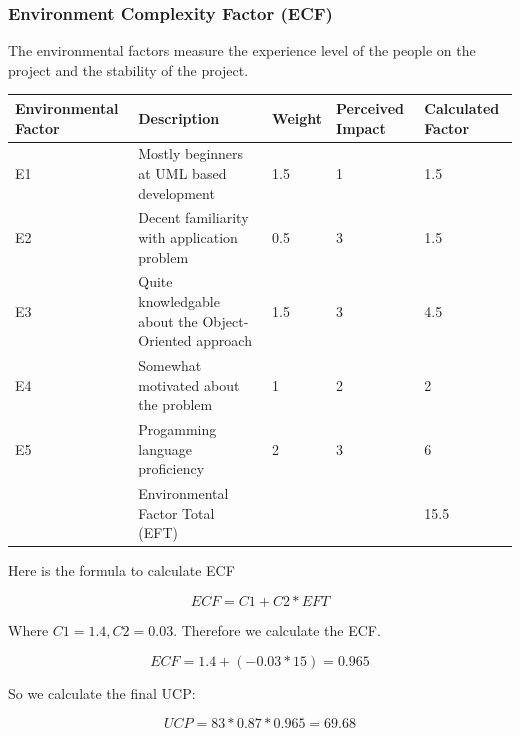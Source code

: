 \documentclass[letterpaper,english, 12pt]{scrreprt}
\begin{document}
\subsubsection{Environment Complexity Factor (ECF)}

The environmental factors measure the experience level of the people on the project and the stability of the project. 

\begin{center}
        \begin{tabular}{|C{3cm}|C{5cm}|C{1.5cm}|C{2cm}|C{2cm}|}
                \hline
                        Environmental Factor & Description & Weight & Perceived Impact & Calculated Factor \\
                \hline
                        E1 & Mostly beginners at UML based development & 1.5 & 1 & 1.5 \\
                \hline
                        E2 & Decent familiarity with application problem& 0.5 & 3 & 1.5\\
                \hline
                        E3 & Quite knowledgable about the Object-Oriented approach & 1.5 & 3 & 4.5 \\
                \hline
                        E4 & Somewhat motivated about the problem & 1 & 2 & 2 \\
                \hline
                        E5 & Progamming language proficiency & 2 & 3 & 6 \\
                \hline
                           & Environmental Factor Total (EFT) & & & 15.5 \\
                \hline
        \end{tabular}
\end{center}

Here is the formula to calculate ECF

\begin{equation}
ECF = C1 + C2 * EFT
\end{equation}

Where $C1 = 1.4, C2 = 0.03$.  Therefore we calculate the ECF.

\begin{equation}
ECF = 1.4 + (-0.03*15)=0.965
\end{equation}

So we calculate the final UCP:

\begin{equation}
UCP = 83*0.87*0.965 = 69.68
\end{equation}
\end{document}
